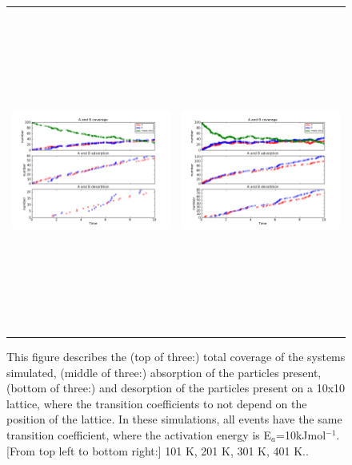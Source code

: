 \documentclass[11pt]{article}
\begin{document}
\begin{figure}[h!]
\begin{tabular}{cc}
\includegraphics[width=3.5in, height=4.2in]{./coadsorb/AtoBcoadsorb10x10_301_allsameklarge__A5_EA10E3_1.png} &
\includegraphics[width=3.5in, height=4.2in]{./coadsorb/AtoBcoadsorb10x10_401_allsameklarge__A5_EA10E3_1.png} 
\end{tabular}
\caption{This figure describes the (top of three:) total coverage of the systems simulated, (middle of three:) absorption of the particles present, (bottom of three:) and desorption of the particles present on a 10x10 lattice, where the transition coefficients to not depend on the position of the lattice. In these simulations, all events have the same transition coefficient, where the activation energy is E$_a$=10kJmol$^{-1}$. [From top left to bottom right:] 101 K, 201 K, 301 K, 401 K.. }
\end{figure}
\end{document}
